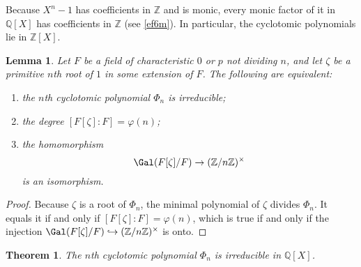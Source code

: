 \documentclass[a4paper,11pt,final,openany]{memoir}
\newtheorem{lemma}[X]{Lemma}
\newtheorem{theorem}[X]{Theorem}
\theoremstyle{nonumberplain}
\newtheorem{proof}{Proof.}
\begin{document}
Because $X^{n}-1$ has coefficients in $\mathbb{Z}$ and is monic, every monic
factor of it in $\mathbb{Q}{}[X]$ has coefficients in $\mathbb{Z}$ (see
\ref{ef6m}). In particular, the cyclotomic polynomials lie in $\mathbb{Z}[X]$.

\begin{lemma}
\label{ag8}Let $F$ be a field of characteristic $0$ or $p$ not dividing $n$,
and let $\zeta$ be a primitive $n$th root of $1$ in some extension of $F$. The
following are equivalent:

\begin{enumerate}
\item the $n$th cyclotomic polynomial $\Phi_{n}$ is irreducible;

\item the degree $[F[\zeta]\colon F]=\varphi(n)$;

\item the homomorphism
\[
\Gal(F[\zeta]/F)\rightarrow(\mathbb{Z}/n\mathbb{Z})^{\times}%
\]
is an isomorphism.
\end{enumerate}
\end{lemma}

\begin{proof}
Because $\zeta$ is a root of $\Phi_{n}$, the minimal polynomial of $\zeta$
divides $\Phi_{n}$. It equals it if and only if $[F[\zeta]\colon
F]=\varphi(n)$, which is true if and only if the injection $\Gal(F[\zeta
]/F)\hookrightarrow(\mathbb{Z}/n\mathbb{Z})^{\times}$ is onto.
\end{proof}

\begin{theorem}
\label{ag9}%
%
The $n$th cyclotomic polynomial $\Phi_{n}$ is irreducible in $\mathbb{Q}[X]$.
\end{theorem}
\end{document}
